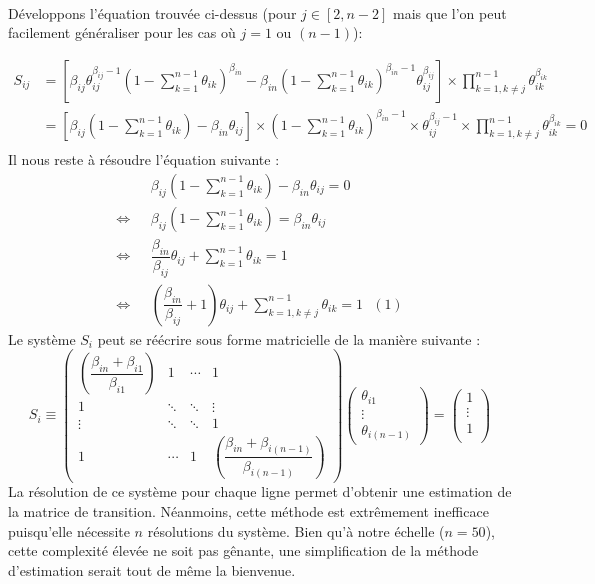 \documentclass[a4paper,titlepage]{report}
\begin{document}
\paragraph{}
Développons l'équation trouvée ci-dessus (pour $j \in [2, n-2]$ mais que l'on peut facilement généraliser pour les cas où $j = 1$ ou $(n-1)$):

\[
	\begin{aligned}
		S_{ij} &= \left[\beta_{ij} \theta_{ij}^{\beta_{ij} - 1} \left(1 - \sum\limits_{k = 1}^{n - 1} \theta_{ik}\right)^{\beta_{in}} - \beta_{in} \left(1 - \sum\limits_{k = 1}^{n - 1} \theta_{ik}\right)^{\beta_{in} - 1} \theta_{ij}^{\beta_{ij}}\right] \times \prod\limits_{k = 1, k \neq j}^{n - 1} \theta_{ik}^{\beta_{ik}}\\
		&= \left[\beta_{ij}  \left(1 - \sum\limits_{k = 1}^{n - 1} \theta_{ik}\right) - \beta_{in}  \theta_{ij}\right]\times \left(1 - \sum\limits_{k = 1}^{n - 1} \theta_{ik}\right)^{\beta_{in} - 1} \times \theta_{ij}^{\beta_{ij} - 1} \times \prod\limits_{k = 1, k \neq j}^{n - 1} \theta_{ik}^{\beta_{ik}} = 0\\
	\end{aligned}
\]
Il nous reste à résoudre l'équation suivante :
\[
	\begin{aligned}
		&\beta_{ij} \left(1 - \sum\limits_{k = 1}^{n - 1} \theta_{ik}\right) - \beta_{in} \theta_{ij} = 0\\
		\Leftrightarrow \text{ }&\beta_{ij} \left(1 - \sum\limits_{k = 1}^{n - 1} \theta_{ik}\right) = \beta_{in} \theta_{ij}\\
		\Leftrightarrow \text{ }& \dfrac{\beta_{in}}{\beta_{ij}} \theta_{ij} + \sum\limits_{k = 1}^{n - 1} \theta_{ik} = 1\\
		\Leftrightarrow \text{ }& \left(\dfrac{\beta_{in}}{\beta_{ij}} + 1\right) \theta_{ij} + \sum\limits_{k = 1, k \neq j}^{n - 1} \theta_{ik} = 1 \text{ } (1)	
	\end{aligned}
\]
Le système $S_i$ peut se réécrire sous forme matricielle de la manière suivante : 
\[
S_i \equiv 
\begin{pmatrix}
\left(\dfrac{\beta_{in} + \beta_{i1}}{\beta_{i1}}\right) & 1 & \cdots & 1 \\
1 & \ddots &  \ddots & \vdots \\
\vdots &  \ddots & \ddots & 1\\
1 & \cdots & 1   & \left(\dfrac{\beta_{in} + \beta_{i(n - 1)}}{\beta_{i(n - 1)}}\right)
\end{pmatrix}
\begin{pmatrix}
\theta_{i1}\\
\vdots\\
\theta_{i(n - 1)}
\end{pmatrix}
= 
\begin{pmatrix}
1\\
\vdots\\
1\\
\end{pmatrix}
\]
La résolution de ce système pour chaque ligne permet d'obtenir une estimation de la matrice de transition. Néanmoins, cette méthode est extrêmement inefficace puisqu'elle nécessite $n$ résolutions du système. Bien qu'à notre échelle ($n = 50$), cette complexité élevée ne soit pas gênante, une simplification de la méthode d'estimation serait tout de même la bienvenue. 
\end{document}
